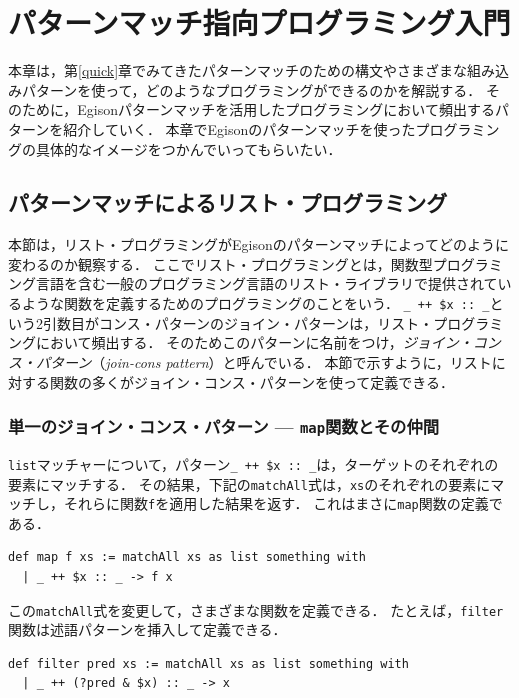 \chapter{パターンマッチ指向プログラミング入門}\label{pmo}

本章は，第\ref{quick}章でみてきたパターンマッチのための構文やさまざまな組み込みパターンを使って，どのようなプログラミングができるのかを解説する．
そのために，Egisonパターンマッチを活用したプログラミングにおいて頻出するパターンを紹介していく．
本章でEgisonのパターンマッチを使ったプログラミングの具体的なイメージをつかんでいってもらいたい．

\section{パターンマッチによるリスト・プログラミング}

本節は，リスト・プログラミングがEgisonのパターンマッチによってどのように変わるのか観察する．
ここでリスト・プログラミングとは，関数型プログラミング言語を含む一般のプログラミング言語のリスト・ライブラリで提供されているような関数を定義するためのプログラミングのことをいう．
\lstinline{_ ++ $x :: _}という2引数目がコンス・パターンのジョイン・パターンは，リスト・プログラミングにおいて頻出する．
そのためこのパターンに名前をつけ，\emph{ジョイン・コンス・パターン}（\emph{join-cons pattern}）と呼んでいる．
本節で示すように，リストに対する関数の多くがジョイン・コンス・パターンを使って定義できる．

\subsection{単一のジョイン・コンス・パターン --- \texttt{map}関数とその仲間}

\lstinline{list}マッチャーについて，パターン\lstinline|_ ++ $x :: _|は，ターゲットのそれぞれの要素にマッチする．
その結果，下記の\lstinline{matchAll}式は，\lstinline{xs}のそれぞれの要素にマッチし，それらに関数\lstinline{f}を適用した結果を返す．
これはまさに\lstinline{map}関数の定義である．

\begin{lstlisting}[language=egison,numbers=none]
def map f xs := matchAll xs as list something with
  | _ ++ $x :: _ -> f x
\end{lstlisting}

この\lstinline{matchAll}式を変更して，さまざまな関数を定義できる．
たとえば，\lstinline{filter}関数は述語パターンを挿入して定義できる．

\begin{lstlisting}[language=egison,numbers=none]
def filter pred xs := matchAll xs as list something with
  | _ ++ (?pred & $x) :: _ -> x
\end{lstlisting}

